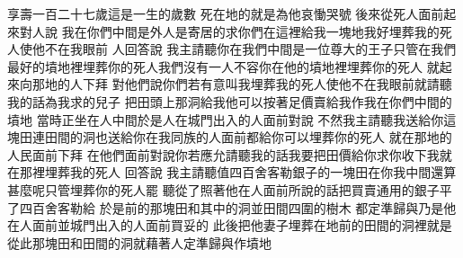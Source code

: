 \bchapter%
享壽一百二十七歲\chientien 這是一生的歲數\chuan 
{}死在地的\chientien 就是\chientien{}為他哀慟哭號\chuan 
{}後來從死人面前起來\chientien 對人說\chientien 
{}我在你們中間是外人\chientien 是寄居的\chientien 求你們在這裡給我一塊地\chientien 我好埋葬我的死人\chientien 使他不在我眼前\chuan 
{}人回答說\chientien 
{}我主請聽\chientien 你在我們中間是一位尊大的王子\chientien 只管在我們最好的墳地裡埋葬你的死人\chientien 我們沒有一人不容你在他的墳地裡埋葬你的死人\chuan 
{}就起來\chientien 向那地的人下拜\chuan 
{}對他們說\chientien 你們若有意叫我埋葬我的死人\chientien 使他不在我眼前\chientien 就請聽我的話\chientien 為我求的兒子\chientien 
{}把田頭上那洞給我\chientien 他可以按著足價賣給我\chientien 作我在你們中間的墳地\chuan 
{}當時正坐在人中間\yuentien 於是人\chientien 在城門出入的人\chientien 面前對說\chientien 
{}不然\chientien 我主請聽\chientien 我送給你這塊田\chientien 連田間的洞\chientien 也送給你\chientien 在我同族的人面前都給你\chientien 可以埋葬你的死人\chuan 
{}就在那地的人民面前下拜\chuan 
{}在他們面前對說\chientien 你若應允\chientien 請聽我的話\chientien 我要把田價給你\chientien 求你收下\chientien 我就在那裡埋葬我的死人\chuan 
{}回答說\chientien 
{}我主請聽\chientien 值四百舍客勒銀子的一塊田\chientien 在你我中間還算甚麼呢\chientien 只管埋葬你的死人罷\chuan 
{}聽從了\chientien 照著他在人面前所說的話\chientien 把買賣通用的銀子\chientien 平了四百舍客勒給\chuan\Chuan
{}於是\chientien {}前\chientien{}的那塊田\chientien 和其中的洞\chientien 並田間四圍的樹木\chientien 
{}都定準歸與\chientien 乃是他在人面前\chientien 並城門出入的人面前買妥的\chuan 
{}此後\chientien{}把他妻子埋葬在地前的田間的洞裡\chientien{}就是\chuan 
{}從此\chientien 那塊田\chientien 和田間的洞\chientien 就藉著人定準\chientien 歸與作墳地\chuan{}\relax%
